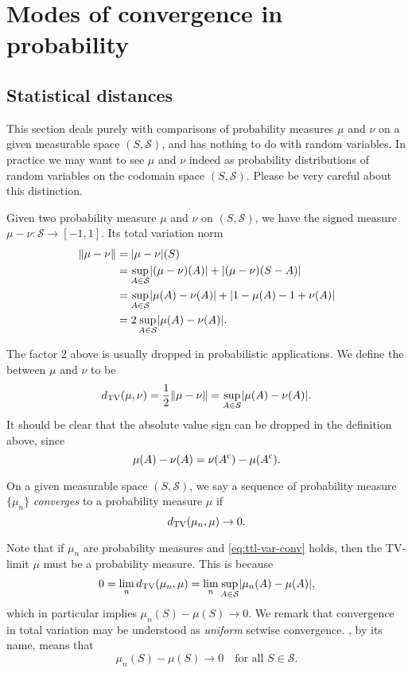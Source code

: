 \chapter{Modes of convergence in probability} \label{chap:modes-conv-prob}
\section{Statistical distances}
\begin{namedthm*}
    This section deals purely with comparisons of probability measures $\mu$ and $\nu$ on a given measurable space $(S,\mathcal S)$, and has nothing to do with random variables. In practice we may want to see $\mu$ and $\nu$ indeed as probability distributions of random variables on the codomain space $(S,\mathcal S)$. Please be very careful about this distinction.
\end{namedthm*}

Given two probability measure $\mu$ and $\nu$ on $(S,\mathcal S)$, we have the signed measure $\mu - \nu \colon \mathcal S \to [-1,1]$. Its total variation norm \begin{align*}
    \lVert \mu - \nu \rVert & = \lvert \mu-\nu \rvert(S) \\
    & = \sup_{A\in \mathcal S}\lvert (\mu-\nu)(A) \rvert + \lvert (\mu-\nu)(S - A) \rvert \\
    & = \sup_{A \in \mathcal S} \lvert \mu(A) - \nu(A) \rvert + \lvert 1 - \mu(A) - 1 + \nu(A) \rvert \\
    & = 2\sup_{A\in \mathcal S}\lvert \mu(A) - \nu(A) \rvert.
\end{align*}

The factor $2$ above is usually dropped in probabilistic applications. We define the  between $\mu$ and $\nu$ to be \[
     d_{\mathrm{TV}}(\mu,\nu) = \frac{1}{2}\lVert \mu - \nu \rVert =\sup_{A \in \mathcal S} \lvert \mu(A) - \nu(A) \rvert.
\] It should be clear that the absolute value sign can be dropped in the definition above, since \[\mu(A) - \nu(A) = \nu(A^{\mathrm{c}}) - \mu(A^{\mathrm{c}}).\]

\begin{defn}
    On a given measurable space $(S,\mathcal S)$, we say a sequence of probability measure $\{\mu_n\}$ \emph{converges} to a probability measure $\mu$  if \begin{equation}
        \tv(\mu_n,\mu) \to 0. \label{eq:ttl-var-conv}
    \end{equation}
\end{defn}
Note that if $\mu_n$ are probability measures and \eqref{eq:ttl-var-conv} holds, then the TV-limit $\mu$ must be a probability measure. This is because \[
    0 = \lim_n d_{\mathrm{TV}}(\mu_n,\mu) = \lim_n \sup_{A\in \mathcal S} \lvert \mu_n(A) - \mu(A) \rvert,
\] which in particular implies $\mu_n (S) - \mu(S) \to 0$. We remark that convergence in total variation may be understood as \emph{uniform} setwise convergence. , by its name, means that \[
    \mu_n (S) - \mu(S) \to 0\quad \text{for all }S\in \mathcal S.
\]

